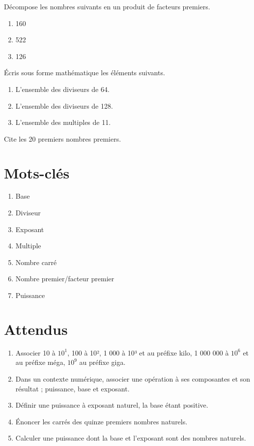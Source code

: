 \documentclass[../../syllabus_1.tex]{subfiles}
\begin{document}
\begin{exercise}
      Décompose les nombres suivants en un produit de facteurs premiers.
      \begin{enumerate}
            \item 160
            \item 522
            \item 126
      \end{enumerate}
\end{exercise}

\begin{exercise}
      Écris sous forme mathématique les éléments suivants. 
      \begin{enumerate}
            \item L'ensemble des diviseurs de 64.
            \item L'ensemble des diviseurs de 128.
            \item L'ensemble des multiples de 11.
      \end{enumerate}
\end{exercise}

\begin{exercise}
Cite les 20 premiers nombres premiers.
\end{exercise}

\newpage
\section*{Mots-clés}
\begin{enumerate}[cols=2, label=\textbf{\arabic*.}]
      \item Base
      \item Diviseur
      \item Exposant
      \item Multiple
      \item Nombre carré
      \item Nombre premier/facteur premier
      \item Puissance
\end{enumerate}

\section*{Attendus}
\begin{enumerate}[label=\textbf{\arabic*.}]
    \item Associer 10 à $10^1$, 100 à 10², 1 000 à 10³ et au préfixe kilo, 1 000 000 à $10^6$ et au préfixe méga, $10^9$ au préfixe giga.
    \item Dans un contexte numérique, associer une opération à ses composantes et son résultat ; puissance, base et exposant.
    \item Définir une puissance à exposant naturel, la base étant positive.
    \item Énoncer les carrés des quinze premiers nombres naturels.
    \item Calculer une puissance dont la base et l'exposant sont des nombres naturels.
\end{enumerate}
\end{document}
